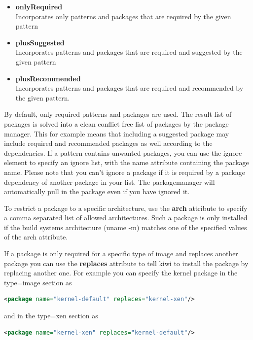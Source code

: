 \begin{itemize}
\item \textbf{onlyRequired}\\
      Incorporates only patterns and packages that are required by the
      given pattern
\item \textbf{plusSuggested}\\
      Incorporates patterns and packages that are required
      and suggested by the given pattern
\item \textbf{plusRecommended}\\
      Incorporates patterns and packages that are required and
      recommended by the given pattern.
\end{itemize}

By default, only required patterns and packages are used. The result
list of packages is solved into a clean conflict free list of packages
by the package manager. This for example means that including a suggested
package may include required and recommended packages as well according
to the dependencies. If a pattern contains unwanted packages, you can use
the ignore element to specify an ignore list, with the name attribute
containing the package name. Please note that you can't ignore a package
if it is required by a package dependency of another package in your list.
The packagemanager will automatically pull in the package even if you have
ignored it.

To restrict a package to a specific architecture, use
the \textbf{arch} attribute to specify a comma separated list of allowed
architectures. Such a package is only installed if the build systems
architecture (uname -m) matches one of the specified values of the arch
attribute.

If a package is only required for a specific type of image
and replaces another package you can use the \textbf{replaces} attribute
to tell kiwi to install the package by replacing another one. For example
you can specify the kernel package in the type=image section as

\begin{lstlisting}[language=xml]
<package name="kernel-default" replaces="kernel-xen"/>
\end{lstlisting}

and in the type=xen section as

\begin{lstlisting}[language=xml]
<package name="kernel-xen" replaces="kernel-default"/>
\end{lstlisting}

